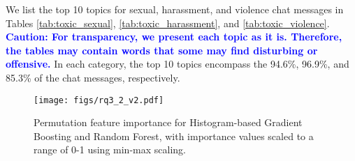 We list the top 10 topics for sexual, harassment, and violence chat messages in Tables \ref{tab:toxic_sexual}, \ref{tab:toxic_harassment}, and \ref{tab:toxic_violence}.
\textcolor{blue}{\textbf{Caution: For transparency, we present each topic as it is. Therefore, the tables may contain words that some may find disturbing or offensive.}}
In each category, the top 10 topics encompass the 94.6\%, 96.9\%, and 85.3\% of the chat messages, respectively.

\begin{figure}[h!]
    \centering
    \texttt{[image: figs/rq3\_2\_v2.pdf]}
    \caption{Permutation feature importance for Histogram-based Gradient Boosting and Random Forest, with importance values scaled to a range of 0-1 using min-max scaling.}
    \label{fig:rq3_importance}
\end{figure}

\newpage

